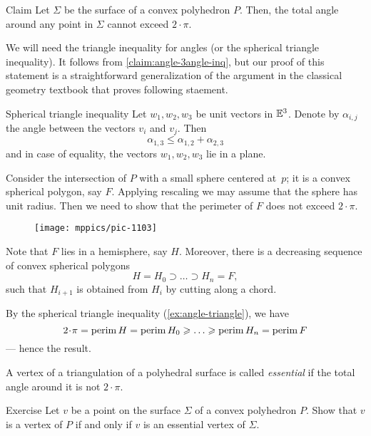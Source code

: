 \begin{thm}{Claim}\label{clm:total-angle}
Let $\Sigma$ be the surface of a convex polyhedron $P$.
Then, the total angle around any point in $\Sigma$ cannot exceed $2\cdot\pi$.
\end{thm} 

We will need the triangle inequality for angles (or the spherical triangle inequality).
It follows from \ref{claim:angle-3angle-inq}, but our proof of this statement is a straightforward generalization of the argument in the classical geometry textbook \cite[§ 47]{kiselev-stereo-en} that proves following staement.

\begin{thm}{Spherical triangle inequality}\label{ex:angle-triangle}
Let $w_1,w_2,w_3$ be unit vectors in $\mathbb{E}^3$.
Denote by $\alpha_{i,j}$ the angle between the vectors $v_i$ and $v_j$.
Then
$$\alpha_{1,3}\le \alpha_{1,2}+\alpha_{2,3}$$
and in case of equality, the vectors $w_1,w_2,w_3$ lie in a plane.
\end{thm}

Consider the intersection of $P$ with a small sphere centered at~$p$;
it is a convex spherical polygon, say $F$.
Applying rescaling we may assume that the sphere has unit radius.
Then we need to show that the perimeter of $F$ does not exceed $2\cdot\pi$.

\begin{wrapfigure}{o}{22mm}
\vskip-4mm
\centering
\texttt{[image: mppics/pic-1103]}
\end{wrapfigure}

Note that $F$ lies in a hemisphere, say $H$.
Moreover, there is a decreasing sequence of convex spherical polygons 
\[H=H_0\supset\dots\supset H_n=F,\]
such that $H_{i+1}$ is obtained from $H_{i}$ by cutting along a chord.

By the spherical triangle inequality (\ref{ex:angle-triangle}), we have
\[
2\cdot\pi=\perim H=\perim H_0\ge\dots\ge\perim H_n=\perim F
\]
--- hence the result.
\qedsf

A vertex of a triangulation of a polyhedral surface is called \emph{essential} if the total angle around it is not $2\cdot\pi$.

\begin{thm}{Exercise}\label{ex:vertex-essential-vertex}
Let $v$ be a point on the surface $\Sigma$ of a convex polyhedron $P$.
Show that $v$ is a vertex of $P$ if and only if 
$v$ is an essential vertex of $\Sigma$.
\end{thm}


